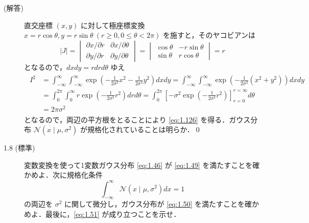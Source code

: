 \documentclass[uplatex,a4paper,oneside,openany,dvipdfmx]{jsarticle}
\numberwithin{equation}{section}
\theoremstyle{mystyle} %
\newcommand{\CN}{\mathcal{N}}
\begin{document}
\begin{description}
\item[(解答)] 直交座標 $(x,y)$ に対して極座標変換 $x = r\cos{\theta}, y = r\sin{\theta}\ (r \ge 0, 0 \le \theta < 2\pi)$ を施すと，そのヤコビアンは
\begin{equation}
    |J| = \begin{vmatrix}
        \partial x / \partial r & \partial x / \partial \theta \\
        \partial y / \partial r & \partial y / \partial \theta
    \end{vmatrix} = \begin{vmatrix}
        \cos{\theta} & -r\sin{\theta} \\
        \sin{\theta} & r\cos{\theta}
    \end{vmatrix} = r
\end{equation}
となるので，$dxdy = rdrd{\theta}$ ゆえ
\begin{align}
    \begin{aligned}
        I^{2} &= \int_{-\infty}^{\infty} \int_{-\infty}^{\infty} \exp{\left(-\frac{1}{2\sigma^{2}}x^{2}-\frac{1}{2\sigma^{2}}y^{2}\right)} dx dy = \int_{-\infty}^{\infty} \int_{-\infty}^{\infty} \exp{\left(-\frac{1}{2\sigma^{2}}(x^{2} + y^{2})\right)} dx dy \\
        &= \int_{0}^{2\pi} \int_{0}^{\infty} r \exp{\left(-\frac{1}{2\sigma^{2}}r^{2}\right)} drd{\theta} = \int_{0}^{2\pi} \left[-\sigma^{2} \exp{\left(-\frac{1}{2\sigma^{2}}r^{2}\right)}\right]_{r=0}^{r=\infty} d{\theta} \\
        &= 2\pi\sigma^{2}
    \end{aligned}
\end{align}
となるので，両辺の平方根をとることにより \eqref{eq:1.126} を得る．ガウス分布 $\CN(x \mid \mu,\sigma^{2})$ が規格化されていることは明らか．\qed

\item[1.8 (標準)]  変数変換を使って1変数ガウス分布 \eqref{eq:1.46} が \eqref{eq:1.49} を満たすことを確かめよ．次に規格化条件
\begin{equation} \label{eq:1.127}
    \int_{-\infty}^{\infty} \CN(x \mid \mu,\sigma^{2}) dx = 1
\end{equation}
の両辺を $\sigma^{2}$ に関して微分し，ガウス分布が \eqref{eq:1.50} を満たすことを確かめよ．最後に，\eqref{eq:1.51} が成り立つことを示せ．


\end{description}
\end{document}
